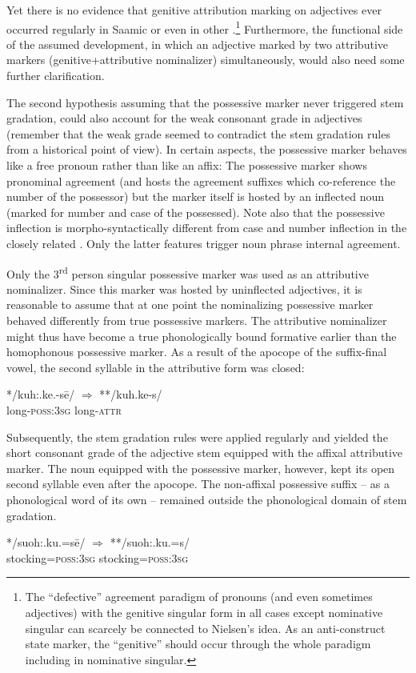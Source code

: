 {Yet there is no evidence that genitive attribution marking on adjectives ever occurred regularly in Saamic or even in other .\footnote{The “defective” agreement paradigm of pronouns (and even sometimes adjectives) with the genitive singular form in all cases except nominative singular can scarcely be connected to Nielsen's idea. As an anti\hyp{}construct state marker, the “genitive” should occur through the whole paradigm including in nominative singular.} Furthermore, the functional side of the assumed development, in which an adjective marked by two attributive markers (genitive+attributive nominalizer) simultaneously, would also need some further clarification.

The second hypothesis assuming that the possessive marker never triggered stem gradation, could also account for the weak consonant grade in adjectives (remember that the weak grade seemed to contradict the stem gradation rules from a historical point of view). In certain aspects, the possessive marker behaves like a free pronoun rather than like an affix: The possessive marker shows pronominal agreement (and hosts the agreement suffixes which co-reference the number of the possessor) but the marker itself is hosted by an inflected noun (marked for number and case of the possessed). Note also that the possessive inflection is morpho-syntactically different from case and number inflection in the closely related . Only the latter features trigger noun phrase internal agreement.

Only the 3\textsuperscript{rd} person singular possessive marker was used as an attributive nominalizer. Since this marker was hosted by uninflected adjectives, it is reasonable to assume that at one point the nominalizing possessive marker behaved differently from true possessive markers. The attributive nominalizer might thus have become a true phonologically bound formative earlier than the homophonous possessive marker. As a result of the apocope of the suffix-final vowel, the second syllable in the attributive form was closed:
\begin{exe}
\ex 
\gll	**/kuh:.ke.-sē/ $\Rightarrow$ **/kuh.ke-s/\\
	long-\textsc{poss:3sg} {} long-\textsc{attr}\\
\end{exe}
Subsequently, the stem gradation rules were applied regularly and yielded the short consonant grade of the adjective stem equipped with the affixal attributive marker. The noun equipped with the possessive marker, however, kept its open second syllable even after the apocope. The non-affixal possessive suffix – as a phonological word of its own – remained outside the phonological domain of stem gradation.
\begin{exe}
\ex 
\gll	**/suoh:.ku.=sē/ $\Rightarrow$ **/suoh:.ku.=s/\\
	stocking=\textsc{poss:3sg} {} stocking=\textsc{poss:3sg}\\
\end{exe}

}
